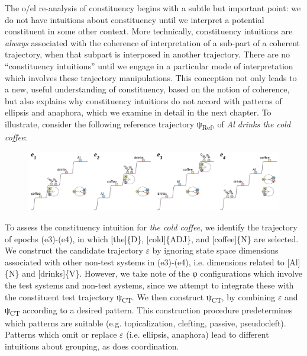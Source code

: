 \ea
  \z
\z

  The o/el re-analysis of constituency begins with a subtle but important point: we do not have intuitions about constituency until we interpret a potential constituent in some other context. More technically, constituency intuitions are \textit{always} associated with the coherence of interpretation of a sub-part of a coherent trajectory, when that subpart is interposed in another trajectory. There are no “constituency intuitions” until we engage in a particular mode of interpretation which involves these trajectory manipulations. This conception not only leads to a new, useful understanding of constituency, based on the notion of coherence, but also explains why constituency intuitions do not accord with patterns of ellipsis and anaphora, which we examine in detail in the next chapter. To illustrate, consider the following reference trajectory ψ\textsubscript{Ref}, of \textit{Al drinks the cold coffee}:

  
\begin{figure}
\includegraphics[width=\textwidth]{figures/Tilsen-img137.png}
\caption{\missingcaption}
\label{fig:}
\end{figure}
  

  To assess the constituency intuition for \textit{the cold coffee}, we identify the trajectory of epochs (e3)-(e4), in which [the]\{D\}, [cold]\{ADJ\}, and [coffee]\{N\} are selected. We construct the candidate trajectory $\varepsilon $ by ignoring state space dimensions associated with other non-test systems in (e3)-(e4), i.e. dimensions related to [Al]\{N\} and [drinks]\{V\}. However, we take note of the φ configurations which involve the test systems and non-test systems, since we attempt to integrate these with the constituent test trajectory ψ\textsubscript{CT}. We then construct ψ\textsubscript{CT}, by combining $\varepsilon $ and ψ\textsubscript{CT} according to a desired pattern. This construction procedure predetermines which patterns are suitable (e.g. topicalization, clefting, passive, pseudocleft). Patterns which omit or replace $\varepsilon $ (i.e. ellipsis, anaphora) lead to different intuitions about grouping, as does coordination.

